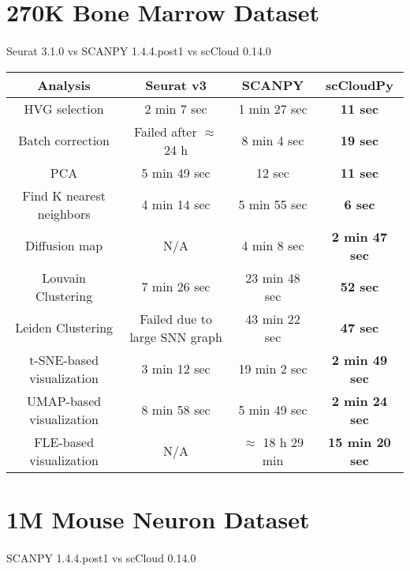 \documentclass[10pt]{article}
\begin{document}
\section{270K Bone Marrow Dataset}

\paragraph{}
Seurat 3.1.0 \qquad vs \qquad SCANPY 1.4.4.post1 \qquad vs \qquad scCloud 0.14.0

\begin{table}[H]
	\centering
	\begin{tabular}{|c|c|c|c|}
		\hline
		Analysis & Seurat v3 & SCANPY & scCloudPy\\
		\hline \hline
		HVG selection & 2 min 7 sec & 1 min 27 sec & \textbf{11 sec} \\
		\hline
		Batch correction & Failed after $\approx$ 24 h & 8 min 4 sec & \textbf{19 sec} \\
		\hline
		PCA & 5 min 49 sec & 12 sec & \textbf{11 sec} \\
		\hline
		Find K nearest neighbors &  4 min 14 sec &  5 min 55 sec & \textbf{6 sec}\\
		\hline
		Diffusion map & N/A & 4 min 8 sec & \textbf{2 min 47 sec} \\
		\hline
		Louvain Clustering & 7 min 26 sec & 23 min 48 sec & \textbf{52 sec} \\
		\hline 
		Leiden Clustering & Failed due to large SNN graph & 43 min 22 sec & \textbf{47 sec}\\
		\hline
		t-SNE-based visualization & 3 min 12 sec & 19 min 2 sec & \textbf{2 min 49 sec}\\
		\hline
		UMAP-based visualization & 8 min 58 sec & 5 min 49 sec  & \textbf{2 min 24 sec}\\
		\hline
		FLE-based visualization & N/A & $\approx$ 18 h 29 min & \textbf{15 min 20 sec}\\
		\hline
	\end{tabular}
\end{table}

\section{1M Mouse Neuron Dataset}

\paragraph{}
SCANPY 1.4.4.post1 \qquad vs \qquad scCloud 0.14.0
\end{document}
